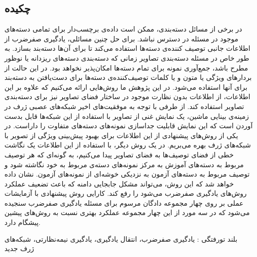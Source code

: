 


\pagestyle{empty}

\subsection*{چکیده}

در برخی از مسائل دسته‌بندی، ممکن است داده‌ی برچسب‌دار برای تمامی دسته‌های موجود در مسئله در دسترس نباشد. برای حل چنین مسائلی، یادگیری صفرضرب از اطلاعات جانبی توصیف کننده‌ی دسته‌ها استفاده می‌کند تا برای آن‌ها دسته‌بند بسازد. به طور خاص در مسئله دسته‌بندی تصاویر زمانی که دسته‌بندی دسته‌های ریزدانه یا نوظور مطرح باشد، جمع‌آوری نمونه برای تمام دسته‌ها امکان‌پذیر نخواهد بود. در این حالت از بردارهای ویژگی یا متون و یا کلمات توصیف‌کننده‌ی دسته‌ها برای دست‌یافتن به دسته‌بند برای آنها استفاده می‌شود. در این پژوهش ما روش‌هایی ارائه می‌کنیم که علاوه بر این اطلاعات، از اطلاعات بدون نظارت موجود در ساختار فضای تصاویر نیز برای دسته‌بندی تصاویر استفاده کند. از طرفی با توجه به موفقیت‌های اخیر شبکه‌های عصبی ژرف در زمینه‌ی بینایی ماشین، یک نمایش غنی از تصاویر با استفاده از این شبکه‌ها قابل بدست آوردن است که این نمایش قابلیت جداسازی نمونه‌های دسته‌های متفاوت را داراست.  در یکی از روش‌های پیشنهادی از این اطلاعات برای بهبود پیش‌بینی ویژگی‌ از تصویر با شبکه‌های ژرف بهره می‌بریم. در یک روش دیگر، با استفاده از این اطلاعات یک نگاشت خطی از فضای توصیف‌ها به فضای تصاویر پیدا می‌کنیم، به گونه‌ای که هر توصیف مربوط به دسته‌های آموزش به مرکز نمونه‌های دسته‌ی مربوط به خود نگاشته شود و توصیف مربوط به دسته‌های آزمون به نزدیکی خوشه‌ای از نمونه‌های آزمون. نشان داده خواهد شد که این روش،
می‌تواند مشکل جابجایی دامنه که باعث تضعیف عملکرد روش‌های یادگیری صفرضرب می‌شود را رفع کند. کارایی روش پیشنهادی با آزمایشات عملی بر روی چهار مجموعه دادگان مرسوم برای مسئله یادگیری صفرضرب سنجیده می‌شود که در سه مورد از این چهار مجموعه عملکرد بهتری نسبت به روش‌های پیشین پیشگام دارد.


‌بلند
‌تورفتگی : 
یادگیری صفرضرب، انتقال یادگیری، یادگیری نیمه‌نظارتی، شبکه‌های ژرف
‌جدید
